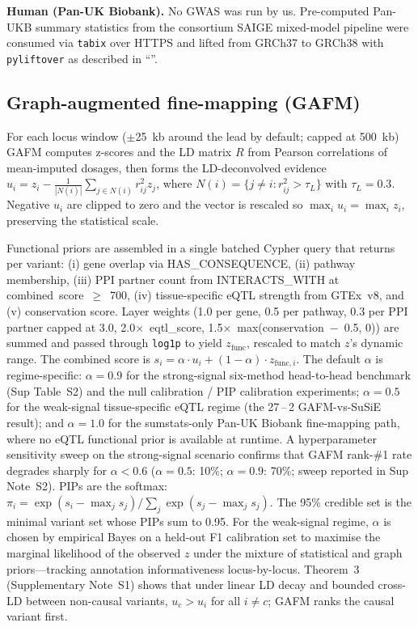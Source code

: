 \textbf{Human (Pan-UK Biobank).} No GWAS was run by us.
Pre-computed Pan-UKB summary statistics from the consortium SAIGE
mixed-model pipeline\cite{karczewski2024pan,bycroft2018uk} were
consumed via \texttt{tabix}\cite{li2011tabix} over HTTPS and
lifted from GRCh37 to GRCh38 with
\texttt{pyliftover} as described in
``''.

\subsection*{Graph-augmented fine-mapping (GAFM)}\label{methods:l1}

For each locus window ($\pm$25~kb around the lead by default; capped
at 500~kb) GAFM computes z-scores and the LD matrix $R$ from Pearson
correlations of mean-imputed dosages, then forms the LD-deconvolved
evidence
$u_i = z_i - \frac{1}{|N(i)|} \sum_{j \in N(i)} r^2_{ij} z_j$,
where $N(i) = \{j \ne i : r^2_{ij} > \tau_L\}$ with $\tau_L = 0.3$.
Negative $u_i$ are clipped to zero and the vector is rescaled so
$\max_i u_i = \max_i z_i$, preserving the statistical scale.

Functional priors are assembled in a single batched Cypher query
that returns per variant: (i) gene overlap via HAS\_CONSEQUENCE,
(ii) pathway membership, (iii) PPI partner count from
INTERACTS\_WITH at combined~score~$\geq$~700, (iv) tissue-specific
eQTL strength from GTEx~v8, and (v) conservation score. Layer
weights (1.0 per gene, 0.5 per pathway, 0.3 per PPI partner capped
at 3.0, 2.0$\times$~eqtl\_score, 1.5$\times$~max(conservation~$-$~0.5, 0))
are summed and passed through \texttt{log1p} to yield $z_{\text{func}}$,
rescaled to match $z$'s dynamic range. The combined score is
$s_i = \alpha \cdot u_i + (1-\alpha) \cdot z_{\text{func},i}$.
The default $\alpha$ is regime-specific: $\alpha{=}0.9$ for the
strong-signal six-method head-to-head benchmark
(Sup Table~S2) and the null calibration / PIP calibration
experiments; $\alpha{=}0.5$ for the weak-signal tissue-specific
eQTL regime (the 27\,--\,2 GAFM-vs-SuSiE result); and
$\alpha{=}1.0$ for the sumstats-only Pan-UK Biobank fine-mapping
path, where no eQTL functional prior is available at runtime.
A hyperparameter sensitivity sweep on the strong-signal scenario
confirms that GAFM rank-\#1 rate degrades sharply for $\alpha < 0.6$
($\alpha=0.5$: 10\%; $\alpha=0.9$: 70\%; sweep reported in Sup
Note~S2). PIPs are the softmax:
$\pi_i = \exp(s_i - \max_j s_j) / \sum_j \exp(s_j - \max_j s_j)$.
The 95\% credible set is the minimal variant set whose PIPs sum to
0.95. For the weak-signal regime, $\alpha$ is chosen by empirical
Bayes on a held-out F1 calibration set to maximise the marginal
likelihood of the observed $z$ under the mixture of statistical and
graph priors---tracking annotation informativeness locus-by-locus.
Theorem~3 (Supplementary Note~S1) shows that under linear LD decay
and bounded cross-LD between non-causal variants, $u_c > u_i$ for
all $i \ne c$; GAFM ranks the causal variant first.

